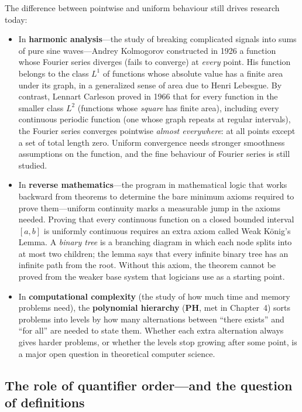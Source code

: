 \begin{historybox}
The difference between pointwise and uniform behaviour still drives research today:
\begin{itemize}
  \item In \textbf{harmonic analysis}---the study of breaking complicated signals into sums of pure sine waves---Andrey Kolmogorov constructed in 1926 a function whose Fourier series diverges (fails to converge) at \emph{every} point. His function belongs to the class $L^1$ of functions whose absolute value has a finite area under its graph, in a generalized sense of area due to Henri Lebesgue. By contrast, Lennart Carleson proved in 1966 that for every function in the smaller class $L^2$ (functions whose \emph{square} has finite area), including every continuous periodic function (one whose graph repeats at regular intervals), the Fourier series converges pointwise \emph{almost everywhere}: at all points except a set of total length zero. Uniform convergence needs stronger smoothness assumptions on the function, and the fine behaviour of Fourier series is still studied.
  \item In \textbf{reverse mathematics}---the program in mathematical logic that works backward from theorems to determine the bare minimum axioms required to prove them---uniform continuity marks a measurable jump in the axioms needed. Proving that every continuous function on a closed bounded interval $[a, b]$ is uniformly continuous requires an extra axiom called Weak K\"onig's Lemma. A \emph{binary tree} is a branching diagram in which each node splits into at most two children; the lemma says that every infinite binary tree has an infinite path from the root. Without this axiom, the theorem cannot be proved from the weaker base system that logicians use as a starting point.
  \item In \textbf{computational complexity} (the study of how much time and memory problems need), the \textbf{polynomial hierarchy} ($\mathbf{PH}$, met in Chapter~4) sorts problems into levels by how many alternations between ``there exists'' and ``for all'' are needed to state them. Whether each extra alternation always gives harder problems, or whether the levels stop growing after some point, is a major open question in theoretical computer science.
\end{itemize}
\end{historybox}

\subsection{The role of quantifier order---and the question of definitions}

